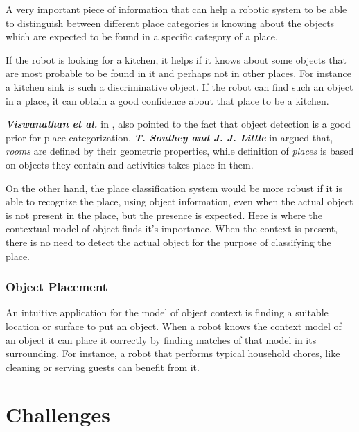       A very important piece of information that can help a robotic system to be able to distinguish between different place categories 
is knowing about the objects which are expected to be found in a specific category of a place. 

If the robot is looking for a kitchen, it helps if it knows about some objects that are most probable to be found in it and 
perhaps not in other places. 
For instance a kitchen sink is such a discriminative object. 
If the robot can find such an object in a place, it can obtain a good confidence about that place to be a kitchen. 

{\bf\it Viswanathan et al.} in \cite{P.Viswanathan}, also  pointed to the fact that object detection is a good prior for place 
categorization. {\bf\it T. Southey and J. J. Little} in \cite{southey2006object} argued that, {\it rooms} are defined by their geometric 
properties, while definition of {\it places} is based on objects they contain and activities takes place in them.  

On the other hand, the place classification system would be more robust if it is able to recognize the place, using object information, 
even when the actual object is not present in the place, but the presence is expected.
Here is where the contextual model of object finds it's importance. When the context is present, there is no need to detect the actual 
object for the purpose of classifying the place.

 
 
 \subsubsection*{Object Placement} 
 
 An intuitive application for the model of object context is finding a suitable location or surface to put an object.
 When a robot knows the context model of an object it can place it correctly by finding matches of that model in its 
 surrounding.
 For instance, a robot that performs typical household chores, like cleaning or serving guests can benefit from it.  
 
 \section{Challenges}
\label{Challenges.sec}

